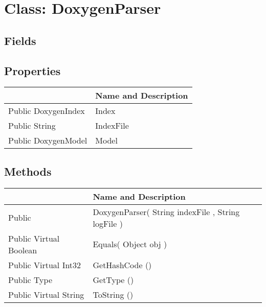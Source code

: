 \documentclass[11pt, oneside, a4paper]{book}
\begin{document}
\hypertarget{SoftwareEngineeringTools.{}Documentation.{}DoxygenParser}{}
\section{Class: DoxygenParser}

\subsection{Fields}

\subsection{Properties}
\begin{center}
\begin{tabular}{| p{3cm} | p{12cm} | }
\hline
\textbf{ } & \textbf{ Name and Description}\\
\hline
 Public  DoxygenIndex &  Index\hypertarget{SoftwareEngineeringTools.{}Documentation.{}DoxygenParser.{}Index}{}\\
\hline
 Public  String &  IndexFile\hypertarget{SoftwareEngineeringTools.{}Documentation.{}DoxygenParser.{}IndexFile}{}\\
\hline
 Public  DoxygenModel &  Model\hypertarget{SoftwareEngineeringTools.{}Documentation.{}DoxygenParser.{}Model}{}\\
\hline
\end{tabular}
\end{center}

\subsection{Methods}
\begin{center}
\begin{tabular}{| p{3cm} | p{12cm} | }
\hline
\textbf{ } & \textbf{ Name and Description}\\
\hline
 Public  &  DoxygenParser(\hypertarget{SoftwareEngineeringTools.{}Documentation.{}DoxygenParser.{}DoxygenParser\_String\_String}{} String  indexFile  ,  String  logFile  )\\
\hline
 Public  Virtual  Boolean &  Equals(\hypertarget{SoftwareEngineeringTools.{}Documentation.{}DoxygenParser.{}Equals\_Object}{} Object  obj  )\\
\hline
 Public  Virtual  Int32 &  GetHashCode ()\hypertarget{SoftwareEngineeringTools.{}Documentation.{}DoxygenParser.{}GetHashCode}{}\\
\hline
 Public  Type &  GetType ()\hypertarget{SoftwareEngineeringTools.{}Documentation.{}DoxygenParser.{}GetType}{}\\
\hline
 Public  Virtual  String &  ToString ()\hypertarget{SoftwareEngineeringTools.{}Documentation.{}DoxygenParser.{}ToString}{}\\
\hline
\end{tabular}
\end{center}
 
\end{document}
